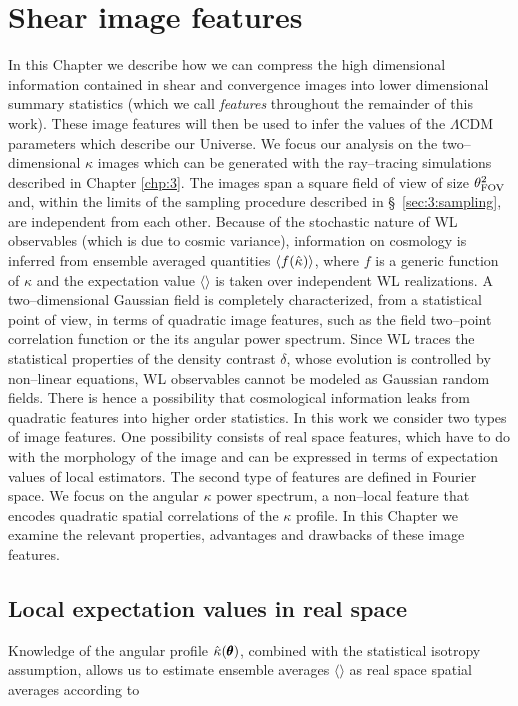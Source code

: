 
\chapter{Shear image features}
 \thispagestyle{plain}
\setlength{\parindent}{10mm}
\label{chp:4}

In this Chapter we describe how we can compress the high dimensional information contained in shear and convergence images into lower dimensional summary statistics (which we call \textit{features} throughout the remainder of this work). These image features will then be used to infer the values of the $\Lambda$CDM parameters which describe our Universe. We focus our analysis on the two--dimensional $\kappa$ images which can be generated with the ray--tracing simulations described in Chapter \ref{chp:3}. The images span a square field of view of size $\theta_{\rm FOV}^2$ and, within the limits of the sampling procedure described in \S~\ref{sec:3:sampling}, are independent from each other. Because of the stochastic nature of WL observables (which is due to cosmic variance), information on cosmology is inferred from ensemble averaged quantities $\langle f(\hat{\kappa})\rangle$, where $f$ is a generic function of $\kappa$ and the expectation value $\langle\rangle$ is taken over independent WL realizations. A two--dimensional Gaussian field is completely characterized, from a statistical point of view, in terms of quadratic image features, such as the field two--point correlation function or the its angular power spectrum. Since WL traces the statistical properties of the density contrast $\delta$, whose evolution is controlled by non--linear equations, WL observables cannot be modeled as Gaussian random fields. There is hence a possibility that cosmological information leaks from quadratic features into higher order statistics. In this work we consider two types of image features. One possibility consists of real space features, which have to do with the morphology of the image and can be expressed in terms of expectation values of local estimators. The second type of features are defined in Fourier space. We focus on the angular $\kappa$ power spectrum, a non--local feature that encodes quadratic spatial correlations of the $\kappa$ profile. In this Chapter we examine the relevant properties, advantages and drawbacks of these image features. 

\section{Local expectation values in real space}
Knowledge of the angular profile $\hat{\kappa}(\pmb{\theta})$, combined with the statistical isotropy assumption, allows us to estimate ensemble averages $\langle\rangle$ as real space spatial averages according to 

